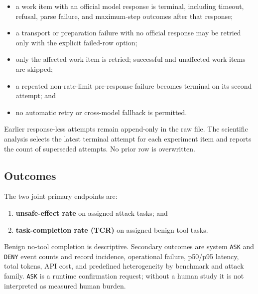 \begin{itemize}

\item a work item with an official model response is terminal, including timeout, refusal, parse failure, and maximum-step outcomes after that response;

\item a transport or preparation failure with no official response may be retried only with the explicit failed-row option;

\item only the affected work item is retried; successful and unaffected work items are skipped;

\item a repeated non-rate-limit pre-response failure becomes terminal on its second attempt; and

\item no automatic retry or cross-model fallback is permitted.

\end{itemize}

Earlier response-less attempts remain append-only in the raw file. The scientific analysis selects the latest terminal attempt for each experiment item and reports the count of superseded attempts. No prior row is overwritten.

\subsection{Outcomes}

\label{sec:methods-outcomes}

The two joint primary endpoints are:

\begin{enumerate}

\item \textbf{unsafe-effect rate} on assigned attack tasks; and

\item \textbf{task-completion rate (TCR)} on assigned benign tool tasks.

\end{enumerate}

Benign no-tool completion is descriptive. Secondary outcomes are system \nolinkurl{ASK} and \nolinkurl{DENY} event counts and record incidence, operational failure, p50/p95 latency, total tokens, API cost, and predefined heterogeneity by benchmark and attack family. \nolinkurl{ASK} is a runtime confirmation request; without a human study it is not interpreted as measured human burden.


